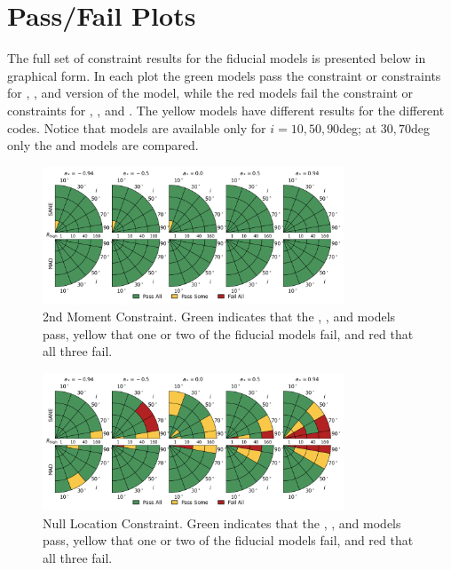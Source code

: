 \section{Pass/Fail Plots}\label{app:tables}

The full set of constraint results for the fiducial models is presented below in graphical form.
In each plot the green models pass the constraint or constraints for \kharma, \bhac, and \hamr version of the model, while the red models fail the constraint or constraints for \kharma, \bhac, and \hamr.
The yellow models have different results for the different codes.
Notice that \hamr models are available only for $i = 10, 50, 90$deg; at $30, 70$deg only the \kharma and \bhac models are compared.


\begin{figure}
  \centering
  \includegraphics[width=0.8\textwidth]{./figures/230GHz_size_Constraints.png}
  \caption{2nd Moment Constraint.  Green indicates that the \kharma, \bhac, and \hamr models pass, yellow that one or two of the fiducial models fail, and red that all three fail.}
  \label{fig:230GHz_size_pizza}
\end{figure}

\begin{figure}
  \centering
  \includegraphics[width=0.8\textwidth]{./figures/Null_loc_Constraints.png}
  \caption{Null Location Constraint.  Green indicates that the \kharma, \bhac, and \hamr models pass, yellow that one or two of the fiducial models fail, and red that all three fail.}
  \label{fig:null_pizza}
\end{figure}

